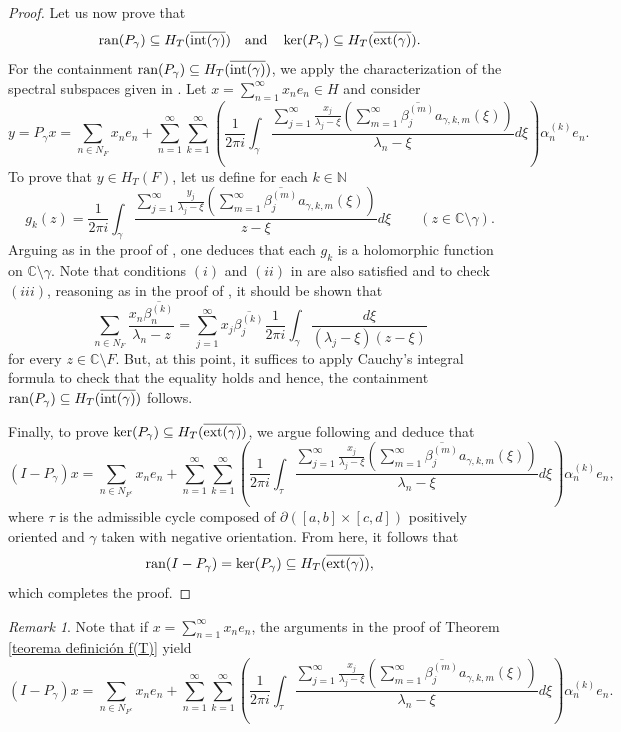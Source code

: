 \documentclass[11pt]{amsart}
\theoremstyle{definition}
\theoremstyle{remark}
\newtheorem{remark}[theorem]{Remark}
\numberwithin{equation}{section}
\newcommand{\ran}{\textnormal{ran}}
\newcommand{\C}{\mathbb{C}}
\newcommand{\N}{\mathbb{N}}
\newcommand{\al}{\alpha}
\newcommand{\Hint}{H_T(\overline{\inte(\gamma)})}
\newcommand{\Hext}{H_T(\overline{\exte(\gamma)})}
\newcommand{\sumn}{\sum_{n=1}^{\infty}}
\newcommand{\summ}{\sum_{m=1}^{\infty}}
\newcommand{\sumj}{\sum_{j=1}^\infty}
\newcommand{\inte}{\textnormal{int}}
\newcommand{\exte}{\textnormal{ext}}
\begin{document}
\begin{proof}
Let us now prove that
$$\ran(P_\gamma) \subseteq H_T(\overline{\inte(\gamma)})
\quad \text{and} \quad
\ker(P_\gamma)\subseteq H_T(\overline{\exte(\gamma)}).
$$
For the containment $\ran(P_\gamma)\subseteq \Hint$, we apply the characterization of the spectral subspaces given in \cite[Theorem 2.2]{GG3}. Let $x=\sumn x_ne_n \in H$ and consider
$$y= P_\gamma x =\sum_{n\in N_F} x_ne_n+\sumn \sum_{k=1}^\infty \left( \frac{1}{2\pi i} \int_{\gamma} \frac{ \sumj \frac{x_j}{\lambda_j-\xi}\left(\summ \overline{\beta_j^{(m)}}a_{\gamma,k,m}(\xi)\right)}{\lambda_n-\xi}        d\xi    \right)\al_n^{(k)}e_n. $$
To prove that $y\in H_T(F)$, let us define for each $k\in \N$
		$$
        g_k(z) = \frac{1}{2\pi i} \int_{\gamma} \frac{ \sumj \frac{y_j}{\lambda_j-\xi}\left(\summ \overline{\beta_j^{(m)}}a_{\gamma, k,m}(\xi)\right)}{z-\xi} d\xi \qquad (z\in \C\setminus \gamma).
        $$
Arguing as in the proof of \cite[Theorem 4.2]{GG3}, one deduces  that each $g_k$ is a holomorphic function on $\C\setminus \gamma.$ Note that conditions $(i)$ and $(ii)$ in \cite[Theorem 2.2]{GG3} are also satisfied and to check $(iii)$, reasoning as in the proof of \cite[Theorem 4.2]{GG3}, it should be shown that
		$$ \sum_{n\in N_F} \frac{x_n\overline{\beta_n^{(k)}}}{\lambda_n-z} = \sumj x_j\overline{\beta_j^{(k)}} \frac{1}{2\pi i}\int_{\gamma}
		\frac{d\xi}{(\lambda_j-\xi)(z-\xi)}$$ for every $z\in \C\setminus F.$ But, at this point, it suffices to apply  Cauchy's integral formula to check that the  equality holds and hence, the containment $\ran(P_\gamma)\subseteq \Hint$ follows.

\medskip

Finally, to prove $\ker(P_\gamma)\subseteq H_T(\overline{\exte(\gamma)})$, we argue following \cite[Lemma 4.3]{GG3} and deduce that
        $$(I-P_\gamma)x = \sum_{n\in N_{F^c}} x_ne_n+\sumn \sum_{k=1}^\infty \left( \frac{1}{2\pi i} \int_{\tau} \frac{ \sumj \frac{x_j}{\lambda_j-\xi}\left(\summ \overline{\beta_j^{(m)}}a_{\gamma,k,m}(\xi)\right)}{\lambda_n-\xi}        d\xi    \right)\al_n^{(k)}e_n,$$
        where $\tau$ is the admissible cycle composed of $\partial ([a,b]\times [c,d])$ positively oriented and $\gamma$ taken with negative orientation. From here, it follows that
        $$
        \ran(I-P_\gamma) = \ker(P_\gamma) \subseteq \Hext,
        $$
        which completes the proof.
\end{proof}


	\begin{remark}\label{remark 5.6}
	    Note that if $x=\sumn x_ne_n$, the arguments in the proof of Theorem \ref{teorema definición f(T)} yield
        $$(I-P_\gamma)x = \sum_{n\in N_{F^c}} x_ne_n+\sumn \sum_{k=1}^\infty \left( \frac{1}{2\pi i} \int_{\tau} \frac{ \sumj \frac{x_j}{\lambda_j-\xi}\left(\summ \overline{\beta_j^{(m)}}a_{\gamma,k,m}(\xi)\right)}{\lambda_n-\xi}        d\xi    \right)\al_n^{(k)}e_n.$$
	\end{remark}
\end{document}
